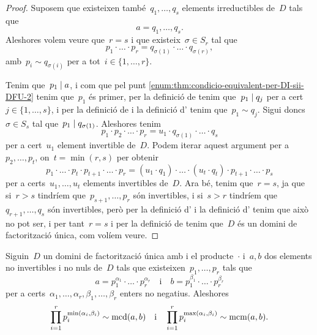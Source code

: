 \documentclass[../../main.tex]{subfiles}
\begin{document}
\begin{proof}
        Suposem que existeixen també~\(q_{1},\dots,q_{s}\) elements irreductibles de~\(D\) tals que
        \[
            a=q_{1},\dots,q_{s}.
        \]
        Aleshores volem veure que~\(r=s\) i que existeix~\(\sigma\in S_{r}\) tal que
        \[
            p_{1}\cdot\ldots\cdot p_{r}=q_{\sigma(1)}\cdot\ldots\cdot q_{\sigma(r)},
        \]
        amb~\(p_{i}\sim q_{\sigma(i)}\) per a tot~\(i\in\{1,\dots,r\}\).

        Tenim que~\(p_{1}\mathrel{|} a\), i com que pel punt \eqref{enum:thm:condicio-equivalent-per-DI-sii-DFU-2} tenim que~\(p_{1}\) és primer, per la definició de  tenim que~\(p_{1}\mathrel{|} q_{j}\) per a cert~\(j\in\{1,\dots,s\}\), i per la definició de  i la definició d' tenim que~\(p_{1}\sim q_{j}\).
        Sigui doncs~\(\sigma\in S_{s}\) tal que~\(p_{1}\mathrel{|} q_{\sigma(1)}\).
        Aleshores tenim
        \[
            p_{1}\cdot p_{2}\cdot\ldots\cdot p_{r}=u_{1}\cdot q_{\sigma(1)}\cdot\ldots\cdot q_{s}
        \]
        per a cert~\(u_{1}\) element invertible de~\(D\).
        Podem iterar aquest argument per a~\(p_{2},\dots,p_{t}\), on~\(t=\min(r,s)\) per obtenir
        \[
            p_{1}\cdot\ldots\cdot p_{t}\cdot p_{t+1}\cdot\ldots\cdot p_{r}=(u_{1}\cdot q_{1})\cdot\ldots\cdot(u_{t}\cdot q_{t})\cdot p_{t+1}\cdot\ldots \cdot p_{s}
        \]
        per a certs~\(u_{1},\dots, u_{t}\) elements invertibles de~\(D\).
        Ara bé, tenim que~\(r=s\), ja que si~\(r>s\) tindríem que~\(p_{s+1},\dots,p_{r}\) són invertibles, i si~\(s>r\) tindríem que~\(q_{r+1},\dots,q_{s}\) són invertibles, però per la definició d' i la definició d' tenim que això no pot ser, i per tant~\(r=s\) i per la definició de  tenim que~\(D\) és un domini de factorització única, com volíem veure.
    \end{proof}
    \begin{proposition}
        Siguin~\(D\) un domini de factorització única amb i el producte~\(\cdot\) i~\(a,b\) dos elements no invertibles i no nuls de~\(D\) tals que existeixen~\(p_{1},\dots,p_{r}\) tals que
        \[
            a=p_{1}^{\alpha_{1}}\cdot\ldots\cdot p_{r}^{\alpha_{r}}\quad\text{i}\quad b=p_{1}^{\beta_{1}}\cdot\ldots\cdot p_{r}^{\beta_{r}}
        \]
        per a certs~\(\alpha_{1},\dots,\alpha_{r},\beta_{1},\dots,\beta_{r}\) enters no negatius.
        Aleshores
        \[
            \prod_{i=1}^{r}p_{i}^{\min(\alpha_{i},\beta_{i})}\sim\operatorname{mcd}(a,b)\quad\text{i}\quad\prod_{i=1}^{r}p_{i}^{\max(\alpha_{i},\beta_{i})}\sim\operatorname{mcm}(a,b).
        \]
    \end{proposition}
\end{document}
